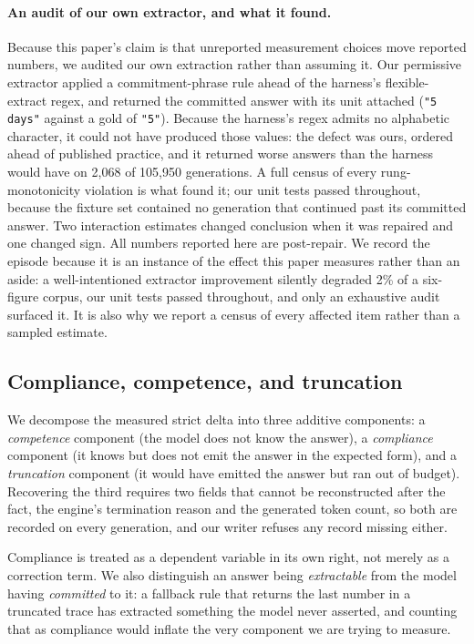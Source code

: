 \documentclass[11pt]{article}
\begin{document}
\paragraph{An audit of our own extractor, and what it found.}
Because this paper's claim is that unreported measurement choices move reported
numbers, we audited our own extraction rather than assuming it. Our permissive extractor applied a commitment-phrase rule
ahead of the harness's flexible-extract regex, and returned the committed answer
with its unit attached (\texttt{"5 days"} against a gold of \texttt{"5"}). Because
the harness's regex admits no alphabetic character, it could not have produced
those values: the defect was ours, ordered ahead of published practice, and it
returned worse answers than the harness would have on 2{,}068 of 105{,}950
generations. A full census of every rung-monotonicity violation is what found it;
our unit tests passed throughout, because the fixture set contained no generation
that continued past its committed answer. Two interaction estimates changed
conclusion when it was repaired and one changed sign. All numbers reported here are post-repair. We record the episode because it is an
instance of the effect this paper measures rather than an aside: a well-intentioned
extractor improvement silently degraded 2\% of a six-figure corpus, our unit tests
passed throughout, and only an exhaustive audit surfaced it. It is also why we report
a census of every affected item rather than a sampled estimate.

\subsection{Compliance, competence, and truncation}
\label{sec:decomp}
We decompose the measured strict delta into three additive components: a
\emph{competence} component (the model does not know the answer), a
\emph{compliance} component (it knows but does not emit the answer in the
expected form), and a \emph{truncation} component (it would have emitted the
answer but ran out of budget). Recovering the third requires two fields that
cannot be reconstructed after the fact, the engine's termination reason and
the generated token count, so both are recorded on every generation, and our
writer refuses any record missing either.

Compliance is treated as a dependent variable in its own right, not merely as a
correction term. We also distinguish an answer being \emph{extractable} from the
model having \emph{committed} to it: a fallback rule that returns the last number
in a truncated trace has extracted something the model never asserted, and
counting that as compliance would inflate the very component we are trying to
measure.
\end{document}
